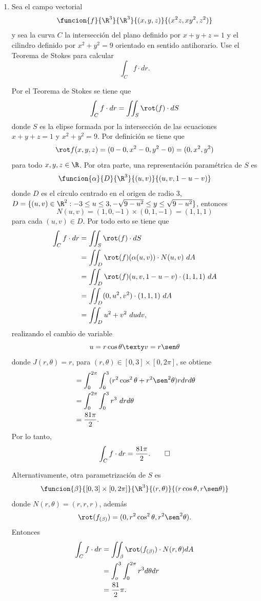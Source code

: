 \documentclass[a4,11pt]{aleph-examen}
\begin{document}
\begin{preguntas}
\begin{respuesta}
\begin{respuesta}
\begin{respuesta}
\begin{enumerate}
\item 
    	Sea el campo vectorial
		\[
		\funcion{f}{\R^3}{\R^3}{(x,y,z)}{(x^2z,xy^2,z^2)}
		\]
		y sea la curva $C$ la intersección del plano definido por $x+y+z=1$ y el cilindro definido por $x^2+y^2=9$ orientado en sentido antihorario. Use el Teorema de Stokes para calcular
		\[
		\int_C f\cdot dr.
		\]

\begin{respuesta}
		Por el Teorema de Stokes se tiene que
		\[
		\int_C f\cdot dr=\iint_S \rot(f) \cdot dS
		\]
		donde $S$ es la elipse formada por la intersección de las ecuaciones $x+y+z=1$ y $x^2+y^2=9$. Por definición se tiene que
		\[
		\rot f(x,y,z)=(0-0,x^2-0,y^2-0)=(0,x^2,y^2)
		\]
		para todo $x,y,z\in\R$. Por otra parte, una representación paramétrica de $S$ es
		\[
		\funcion{\alpha}{D}{\R^3}{(u,v)}{(u,v,1-u-v)}
		\]
		donde $D$ es el círculo centrado en el origen de radio 3, $D=\{(u,v)\in\R^2:-3\leq u \leq 3,-\sqrt{9-u^2}\leq y \leq \sqrt{9-u^2} \}$, entonces
		\[
		N(u,v)=(1,0,-1)\times(0,1,-1)=(1,1,1)
		\]
		para cada $(u,v)\in D$. Por todo esto se tiene que
			\begin{align*}
				\int_C f\cdot dr
				&=\iint_S \rot(f) \cdot dS\\
				&=\iint_D \rot(f)(\alpha(u,v)) \cdot N(u,v)\ dA\\
				&=\iint_D \rot(f)(u,v,1-u-v) \cdot (1,1,1)\ dA\\
				&=\iint_D (0,u^2,v^2) \cdot (1,1,1)\ dA\\
				&=\iint_D u^2+v^2\ dudv,\\
			\end{align*}
		realizando el cambio de variable
		\[
		    u=r\cos\theta \texty v=r\sen \theta
		\]
		donde $J(r,\theta)=r$, para $(r,\theta)\in [0,3]\times[0,2\pi]$, se obtiene
		    \begin{align*}
		        &=\int_0^{2\pi} \int_0^3 (r^2\cos^2\theta+r^2\sen^2\theta)rdrd\theta\\
		        &=\int_0^{2\pi} \int_0^3 r^3\ drd\theta\\
				&=\dfrac{81\pi}{2}.
		    \end{align*}
		Por lo tanto,
		\[
		\int_C f\cdot dr=\dfrac{81\pi}{2}.\qedhere
		\]
		
		Alternativamente, otra parametrización de $S$ es
		\[
		    \funcion{\beta}{[0,3]\times[0,2\pi]}{\R^3}{(r,\theta)}{(r\cos\theta,r\sen\theta)}
		\]
		donde $N(r,\theta)=(r,r,r)$, además
		\[
		    \rot(f_{(\beta)})=(0,r^2\cos^2\theta,r^2\sen^2\theta).
		\]
		Entonces
		\begin{align*}
		    	\int_C f\cdot dr&=\iint_{\beta}\rot(f_{(\beta)})\cdot N(r,\theta) dA\\
		    	&=\int_o^3\int_0^{2\pi}r^3d\theta dr\\
		    	&=\dfrac{81}{2}\pi.
		\end{align*}
\end{respuesta}



\end{enumerate}
\end{respuesta}
\end{respuesta}
\end{respuesta}
\end{preguntas}
\end{document}
